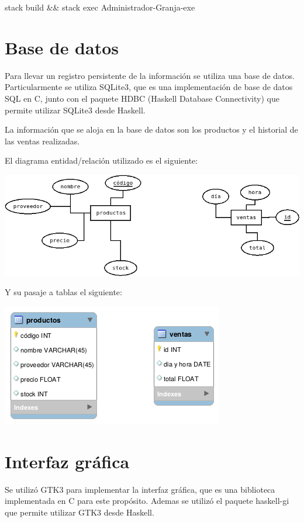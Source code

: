 \documentclass[a4paper,10pt]{article}
\begin{document}
\noindent
stack build \&\& stack exec Administrador-Granja-exe


\section{Base de datos}
Para llevar un registro persistente de la información se utiliza una base de datos. Particularmente se utiliza SQLite3, que es una implementación de base de datos SQL en C, junto con el paquete HDBC (Haskell Database Connectivity) que permite utilizar SQLite3 desde Haskell.

La información que se aloja en la base de datos son los productos y el historial de las ventas realizadas.

El diagrama entidad/relación utilizado es el siguiente:
\begin{center}
\includegraphics[scale=.5]{diagrama_entidad_relacion.png}
\end{center}

Y su pasaje a tablas el siguiente:
\begin{center}
\includegraphics[scale=.5]{tablas.png}
\end{center}

\section{Interfaz gráfica}
Se utilizó GTK3 para implementar la interfaz gráfica, que es una biblioteca implementada en C para este propósito. Ademas se utilizó el paquete haskell-gi que permite utilizar GTK3 desde Haskell.
\end{document}
